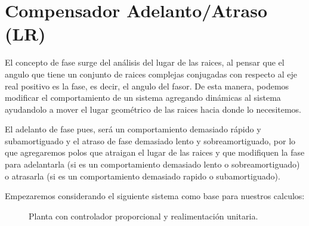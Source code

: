 
\chapter{Compensador Adelanto/Atraso (LR)}

    El concepto de fase surge del análisis del lugar de las raices, al pensar que el angulo que tiene un conjunto de raices complejas conjugadas con respecto al eje real positivo es la fase, es decir, el angulo del fasor. De esta manera, podemos modificar el comportamiento de un sistema agregando dinámicas al sistema ayudandolo a mover el lugar geométrico de las raices hacia donde lo necesitemos.

    El adelanto de fase pues, será un comportamiento demasiado rápido y subamortiguado y el atraso de fase demasiado lento y sobreamortiguado, por lo que agregaremos polos que atraigan el lugar de las raices y que modifiquen la fase para adelantarla (si es un comportamiento demasiado lento o sobreamortiguado) o atrasarla (si es un comportamiento demasiado rapido o subamortiguado).

    Empezaremos considerando el siguiente sistema como base para nuestros calculos:

    \begin{figure}
        \centering
        \caption{\label{dia:caa1}Planta con controlador proporcional y realimentación unitaria.}
    \end{figure}

